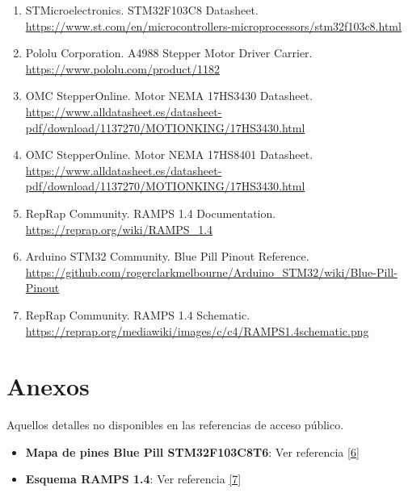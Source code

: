 \documentclass[12pt]{article}
\begin{document}
\begin{enumerate}
  \item \label{ref1} STMicroelectronics. STM32F103C8 Datasheet. \\
  \url{https://www.st.com/en/microcontrollers-microprocessors/stm32f103c8.html}
  
  \item \label{ref2} Pololu Corporation. A4988 Stepper Motor Driver Carrier. \\
  \url{https://www.pololu.com/product/1182}
  
  \item \label{ref3} OMC StepperOnline. Motor NEMA 17HS3430 Datasheet. \\
  \url{https://www.alldatasheet.es/datasheet-pdf/download/1137270/MOTIONKING/17HS3430.html}
  
  \item \label{ref4} OMC StepperOnline. Motor NEMA 17HS8401 Datasheet. \\
  \url{https://www.alldatasheet.es/datasheet-pdf/download/1137270/MOTIONKING/17HS3430.html}
  
  \item \label{ref5} RepRap Community. RAMPS 1.4 Documentation. \\
  \url{https://reprap.org/wiki/RAMPS_1.4}
  
  \item \label{ref6} Arduino STM32 Community. Blue Pill Pinout Reference. \\
  \url{https://github.com/rogerclarkmelbourne/Arduino_STM32/wiki/Blue-Pill-Pinout}
  
  \item \label{ref7} RepRap Community. RAMPS 1.4 Schematic. \\
  \url{https://reprap.org/mediawiki/images/c/c4/RAMPS1.4schematic.png}
\end{enumerate}


\section{Anexos}
Aquellos detalles no disponibles en las referencias de acceso público.

\begin{itemize}
  \item \textbf{Mapa de pines Blue Pill STM32F103C8T6}: Ver referencia \hyperref[ref6]{[6]}
  \item \textbf{Esquema RAMPS 1.4}: Ver referencia \hyperref[ref7]{[7]}
\end{itemize}
\end{document}
